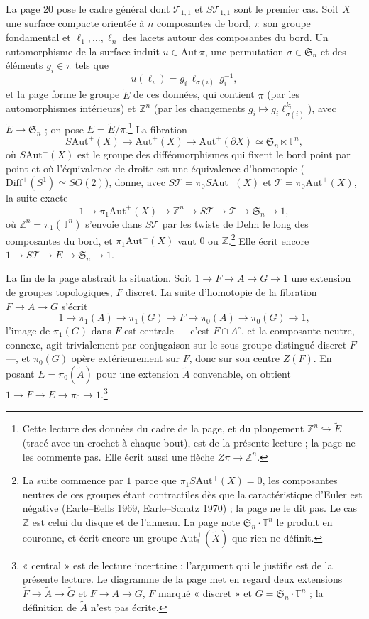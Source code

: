 \documentclass[11pt,a4paper]{article}
\begin{document}
La page 20 pose le cadre général dont $\mathcal{T}_{1,1}$ et $S\mathcal{T}_{1,1}$
sont le premier cas. Soit $X$ une surface compacte orientée à $n$ composantes de
bord, $\pi$ son groupe fondamental et $\ell_1, \dots, \ell_n$ des lacets autour
des composantes du bord. Un automorphisme de la surface induit
$u \in \mathrm{Aut}\,\pi$, une permutation $\sigma \in \mathfrak{S}_n$ et des
éléments $g_i \in \pi$ tels que
\[
u(\ell_i) = g_i\,\ell_{\sigma(i)}\,g_i^{-1} ,
\]
et la page forme le groupe $\widetilde{E}$ de ces données, qui contient $\pi$
(par les automorphismes intérieurs) et $\mathbb{Z}^n$ (par les changements
$g_i \mapsto g_i\ell_{\sigma(i)}^{k_i}$), avec $\widetilde{E} \to \mathfrak{S}_n$ ;
on pose $E = \widetilde{E}/\pi$.\footnote{Cette lecture des données du cadre de la
page, et du plongement $\mathbb{Z}^n \hookrightarrow \widetilde{E}$ (tracé avec un
crochet à chaque bout), est de la présente lecture ; la page ne les commente
pas. Elle écrit aussi une flèche $Z\pi \to \mathbb{Z}^n$.} La fibration
\[
S\mathrm{Aut}^{+}(X) \to \mathrm{Aut}^{+}(X) \to \mathrm{Aut}^{+}(\partial X)
\simeq \mathfrak{S}_n \ltimes \mathbb{T}^n ,
\]
où $S\mathrm{Aut}^{+}(X)$ est le groupe des difféomorphismes qui fixent le bord
point par point et où l'équivalence de droite est une équivalence d'homotopie
($\mathrm{Diff}^{+}(S^1) \simeq SO(2)$), donne, avec
$S\mathcal{T} = \pi_0 S\mathrm{Aut}^{+}(X)$ et $\mathcal{T} = \pi_0
\mathrm{Aut}^{+}(X)$, la suite exacte
\[
1 \to \pi_1\mathrm{Aut}^{+}(X) \to \mathbb{Z}^n \to S\mathcal{T} \to \mathcal{T}
\to \mathfrak{S}_n \to 1 ,
\]
où $\mathbb{Z}^n = \pi_1(\mathbb{T}^n)$ s'envoie dans $S\mathcal{T}$ par les
twists de Dehn le long des composantes du bord, et $\pi_1\mathrm{Aut}^{+}(X)$ vaut
$0$ ou $\mathbb{Z}$.\footnote{La suite commence par $1$ parce que
$\pi_1 S\mathrm{Aut}^{+}(X) = 0$, les composantes neutres de ces groupes étant
contractiles dès que la caractéristique d'Euler est négative (Earle--Eells 1969,
Earle--Schatz 1970) ; la page ne le dit pas. Le cas $\mathbb{Z}$ est celui du
disque et de l'anneau. La page note $\mathfrak{S}_n \cdot \mathbb{T}^n$ le produit
en couronne, et écrit encore un groupe $\mathrm{Aut}^{+}_{!}(\widetilde{X})$ que
rien ne définit.} Elle écrit encore $1 \to S\mathcal{T} \to E \to \mathfrak{S}_n
\to 1$.

La fin de la page abstrait la situation. Soit $1 \to F \to A \to G \to 1$ une
extension de groupes topologiques, $F$ discret. La suite d'homotopie de la
fibration $F \to A \to G$ s'écrit
\[
1 \to \pi_1(A) \to \pi_1(G) \to F \to \pi_0(A) \to \pi_0(G) \to 1 ,
\]
l'image de $\pi_1(G)$ dans $F$ est centrale — c'est $F \cap A^{\circ}$, et la
composante neutre, connexe, agit trivialement par conjugaison sur le sous-groupe
distingué discret $F$ —, et $\pi_0(G)$ opère extérieurement sur $F$, donc sur
son centre $Z(F)$. En posant $E = \pi_0(\widetilde{A})$ pour une extension
$\widetilde{A}$ convenable, on obtient $1 \to F \to E \to \pi_0 \to
1$.\footnote{« central » est de lecture incertaine ; l'argument qui le justifie est
de la présente lecture. Le diagramme de la page met en regard deux extensions
$\widetilde{F} \to \widetilde{A} \to \widetilde{G}$ et $F \to A \to G$, $F$
marqué « discret » et $G = \mathfrak{S}_n \cdot \mathbb{T}^n$ ; la définition de
$\widetilde{A}$ n'est pas écrite.}
\end{document}
